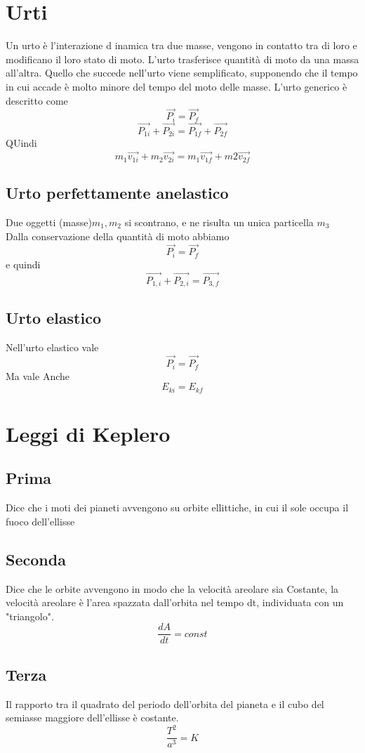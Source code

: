 \documentclass[a4paper]{report}
\begin{document}
  \section{Urti}
  Un urto è l'interazione d inamica tra due masse, vengono in contatto tra di loro e modificano il loro stato di moto.
  L'urto trasferisce quantità di moto da una massa all'altra. Quello che succede nell'urto viene semplificato, supponendo che il tempo in cui accade è molto minore del tempo del moto delle masse.
  L'urto generico è descritto come
  $$ \vec{P_i} = \vec{P_f}$$
  $$ \vec{P_{1i}} + \vec{P_{2i}} = \vec{P_{1f}} + \vec{P_{2f}}$$
  QUindi
  $$m_1 \vec{v_{1i}} + m_2 \vec{v_{2i}} = m_1 \vec{v_{1f}} + m2 \vec{v_{2f}}$$
  \subsection{Urto perfettamente anelastico}
  Due oggetti (masse)$m_1, m_2$ si scontrano, e ne risulta un unica particella $m_3$\\
  Dalla conservazione della quantità di moto abbiamo
  $$ \vec{P_i} = \vec{P_f} $$
  e quindi
  $$ \vec{P_{1,i}} + \vec{P_{2,i}} = \vec{P_{3,f}} $$

  \subsection{Urto elastico}
  Nell'urto elastico vale
  $$\vec{P_i} = \vec{P_f}$$
  Ma vale Anche
  $$E_{ki} = E_{kf}$$




  \section{Leggi di Keplero}
  \subsection{Prima}
  Dice che i moti dei pianeti avvengono su orbite ellittiche, in cui il sole occupa il fuoco dell'ellisse
  \subsection{Seconda}
  Dice che le orbite avvengono in modo che la velocità areolare sia Costante, la velocità areolare è l'area spazzata dall'orbita nel tempo dt, individuata con un "triangolo".
  $$ \frac{dA}{dt} = const$$
  \subsection{Terza}
  Il rapporto tra il quadrato del periodo dell'orbita del pianeta e il cubo del semiasse maggiore dell'ellisse è costante.
  $$ \frac{T^2}{a^3} = K $$
\end{document}
